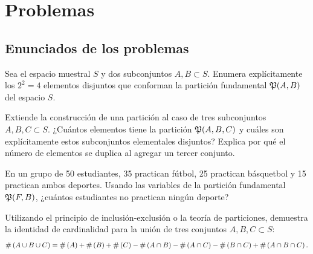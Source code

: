 \section*{Problemas}

\subsection*{Enunciados de los problemas}

\begin{problema}
	\label{prob:b94325d}
	Sea el espacio muestral $S$ y dos subconjuntos $A, B \subset S$. Enumera explícitamente los $2^2 = 4$ elementos disjuntos que conforman la partición fundamental $\mathfrak{P}(A,B)$ del espacio $S$.
\end{problema}

\begin{problema}
	\label{prob:320d62d}
	Extiende la construcción de una partición al caso de tres subconjuntos $A, B, C \subset S$. ¿Cuántos elementos tiene la partición $\mathfrak{P}(A,B,C)$ y cuáles son explícitamente estos subconjuntos elementales disjuntos? Explica por qué el número de elementos se duplica al agregar un tercer conjunto.
\end{problema}

\begin{problema}
	\label{prob:18eada9}
	En un grupo de 50 estudiantes, 35 practican fútbol, 25 practican básquetbol y 15 practican ambos deportes. Usando las variables de la partición fundamental $\mathfrak{P}(F,B)$, ¿cuántos estudiantes no practican ningún deporte?
\end{problema}

\begin{problema}
	\label{prob:6d1bd44}
	Utilizando el principio de inclusión-exclusión o la teoría de particiones, demuestra la identidad de cardinalidad para la unión de tres conjuntos $A, B, C \subset S$:
	\begin{align}
		\#\left( A \cup B \cup C \right) = \#\left( A \right) + \#\left( B \right) + \#\left( C \right) - \#\left( A \cap B \right) - \#\left( A \cap C \right) - \#\left( B \cap C \right) + \#\left( A \cap B \cap C \right).
	\end{align}
\end{problema}

